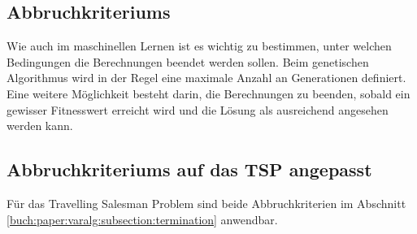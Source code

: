 %
%
%
%
\subsection{Abbruchkriteriums
\label{buch:paper:varalg:subsection:termination}}
Wie auch im maschinellen Lernen ist es wichtig zu bestimmen, unter 
welchen Bedingungen die Berechnungen beendet werden sollen. Beim 
genetischen Algorithmus wird in der Regel eine maximale Anzahl an 
Generationen definiert. Eine weitere Möglichkeit besteht darin, 
die Berechnungen zu beenden, sobald ein gewisser Fitnesswert erreicht 
wird und die Lösung als ausreichend angesehen werden kann.

\subsection{Abbruchkriteriums auf das TSP angepasst
\label{buch:paper:varalg:subsection:termination_tsp}}
Für das Travelling Salesman Problem sind beide Abbruchkriterien im 
Abschnitt \ref{buch:paper:varalg:subsection:termination} anwendbar.

